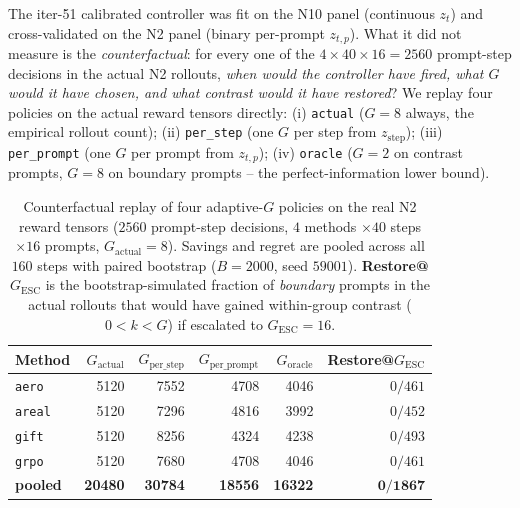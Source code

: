 The iter-51 calibrated controller was fit on the N10 panel
(continuous $z_t$) and cross-validated on the N2 panel
(binary per-prompt $z_{t,p}$). What it did not measure is the
\emph{counterfactual}: for every one of the
$4 \times 40 \times 16 = 2560$ prompt-step decisions in the actual
N2 rollouts, \emph{when would the controller have fired, what $G$
would it have chosen, and what contrast would it have restored}?
We replay four policies on the actual reward tensors directly:
(i) \texttt{actual} ($G=8$ always, the empirical rollout count);
(ii) \texttt{per\_step} (one $G$ per step from $z_{\mathrm{step}}$);
(iii) \texttt{per\_prompt} (one $G$ per prompt from $z_{t,p}$);
(iv) \texttt{oracle} ($G=2$ on contrast prompts, $G=8$ on boundary
prompts -- the perfect-information lower bound).

\begin{table}[t]
\centering
\caption{Counterfactual replay of four adaptive-$G$ policies on the
real N2 reward tensors ($2560$ prompt-step decisions, $4$ methods
$\times 40$ steps $\times 16$ prompts, $G_{\mathrm{actual}}=8$).
Savings and regret are pooled across all $160$ steps with paired
bootstrap ($B{=}2000$, seed $59001$). \textbf{Restore@$G_{\mathrm{ESC}}$}
is the bootstrap-simulated fraction of \emph{boundary} prompts in
the actual rollouts that would have gained within-group contrast
($0 < k < G$) if escalated to $G_{\mathrm{ESC}}{=}16$.
\label{tab:p7-cf-granularity}}
\begin{tabular}{lrrrrr}
\toprule
Method & $G_{\mathrm{actual}}$ & $G_{\mathrm{per\_step}}$ & $G_{\mathrm{per\_prompt}}$ & $G_{\mathrm{oracle}}$ & Restore@$G_{\mathrm{ESC}}$ \\
\midrule
\texttt{aero}   & 5120 & 7552 & 4708 & 4046 & $0/461$ \\
\texttt{areal}  & 5120 & 7296 & 4816 & 3992 & $0/452$ \\
\texttt{gift}   & 5120 & 8256 & 4324 & 4238 & $0/493$ \\
\texttt{grpo}   & 5120 & 7680 & 4708 & 4046 & $0/461$ \\
\midrule
\textbf{pooled} & \textbf{20480} & \textbf{30784} & \textbf{18556} & \textbf{16322} & $\mathbf{0/1867}$ \\
\bottomrule
\end{tabular}
\end{table}

